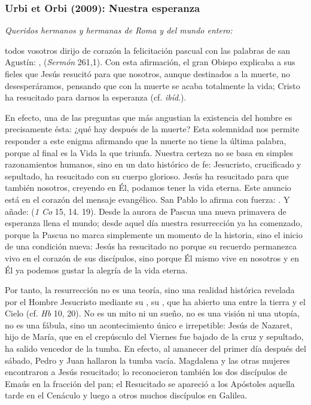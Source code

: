 \subsubsection{Urbi et Orbi (2009): Nuestra esperanza}


\begin{body}
\textit{Queridos hermanos y hermanas de Roma y del mundo entero:} 

 todos vosotros dirijo de corazón la felicitación pascual con las palabras de san Agustín: ,  (\textit{Sermón} 261,1). Con esta afirmación, el gran Obispo explicaba a sus fieles que Jesús resucitó para que nosotros, aunque destinados a la muerte, no desesperáramos, pensando que con la muerte se acaba totalmente la vida; Cristo ha resucitado para darnos la esperanza (cf. \textit{ibíd}.). 

En efecto, una de las preguntas que más angustian la existencia del hombre es precisamente ésta: ¿qué hay después de la muerte? Esta solemnidad nos permite responder a este enigma afirmando que la muerte no tiene la última palabra, porque al final es la Vida la que triunfa. Nuestra certeza no se basa en simples razonamientos humanos, sino en un dato histórico de fe: Jesucristo, crucificado y sepultado, ha resucitado con su cuerpo glorioso. Jesús ha resucitado para que también nosotros, creyendo en Él, podamos tener la vida eterna. Este anuncio está en el corazón del mensaje evangélico. San Pablo lo afirma con fuerza: . Y añade:  (\textit{1 Co} 15, 14. 19). Desde la aurora de Pascua una nueva primavera de esperanza llena el mundo; desde aquel día nuestra resurrección ya ha comenzado, porque la Pascua no marca simplemente un momento de la historia, sino el inicio de una condición nueva: Jesús ha resucitado no porque su recuerdo permanezca vivo en el corazón de sus discípulos, sino porque Él mismo vive en nosotros y en Él ya podemos gustar la alegría de la vida eterna.

Por tanto, la resurrección no es una teoría, sino una realidad histórica revelada por el Hombre Jesucristo mediante su , su , que ha abierto una  entre la tierra y el Cielo (cf. \textit{Hb} 10, 20). No es un mito ni un sueño, no es una visión ni una utopía, no es una fábula, sino un acontecimiento único e irrepetible: Jesús de Nazaret, hijo de María, que en el crepúsculo del Viernes fue bajado de la cruz y sepultado, ha salido vencedor de la tumba. En efecto, al amanecer del primer día después del sábado, Pedro y Juan hallaron la tumba vacía. Magdalena y las otras mujeres encontraron a Jesús resucitado; lo reconocieron también los dos discípulos de Emaús en la fracción del pan; el Resucitado se apareció a los Apóstoles aquella tarde en el Cenáculo y luego a otros muchos discípulos en Galilea. 


\end{body}
